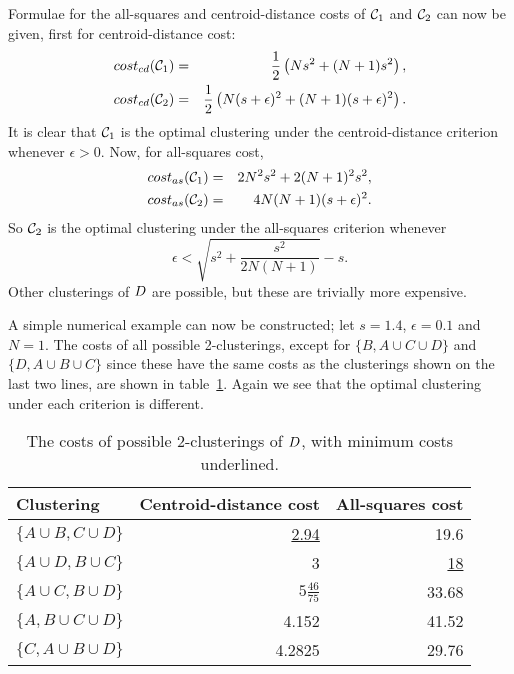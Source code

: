Formulae for the all-squares and centroid-distance costs of $\mathcal{C}_1$ and
$\mathcal{C}_2$ can now be given, first for centroid-distance cost:
\begin{eqnarray*}
  cost_{cd}(\mathcal{C}_1) &=& \frac{1}{2}\left(Ns^2+(N+1)s^2\right), \\
  cost_{cd}(\mathcal{C}_2) &=& \frac{1}{2}\left(N(s+\epsilon)^2+(N+1)(s+\epsilon)^2\right).
\end{eqnarray*}
It is clear that $\mathcal{C}_1$ is the optimal clustering under the
centroid-distance criterion whenever $\epsilon > 0$.  Now, for all-squares
cost,
\begin{eqnarray*}
  cost_{as}(\mathcal{C}_1) &=& 2N^2s^2+2(N+1)^2s^2, \\
  cost_{as}(\mathcal{C}_2) &=& 4N(N+1)(s+\epsilon)^2.
\end{eqnarray*}
So $\mathcal{C}_2$ is the optimal clustering under the all-squares criterion
whenever
\begin{equation*}
  \epsilon < \sqrt{s^2 + \frac{s^2}{2N(N+1)}} - s.
\end{equation*}
Other clusterings of $D$ are possible, but these are trivially more
expensive.

A simple numerical example can now be constructed; let $s=1.4$, $\epsilon=0.1$
and $N=1$.  The costs of all possible 2-clusterings, except for $\{B, A \cup C
\cup D\}$ and $\{D, A \cup B \cup C\}$ since these have the same costs as the
clusterings shown on the last two lines, are shown in table~\ref{tab:costs}.
Again we see that the optimal clustering under each criterion is different.

\begin{table}
  \centering
  \caption{The costs of possible 2-clusterings
    of $D$, with minimum costs underlined.}
  \begin{tabular}{lrr}
  \toprule
  Clustering & Centroid-distance cost & All-squares cost \\
  \midrule
  $\{A \cup B, C \cup D\}$ & \underline{2.94} & 19.6 \\
  $\{A \cup D, B \cup C\}$ & 3 & \underline{18} \\
  $\{A \cup C, B \cup D\}$ & $5\frac{46}{75}$ & 33.68 \\
  $\{A, B \cup C \cup D\}$ & 4.152 & 41.52 \\
  $\{C, A \cup B \cup D\}$ & 4.2825 & 29.76 \\
  \bottomrule
\end{tabular}
\label{tab:costs}
\end{table}


